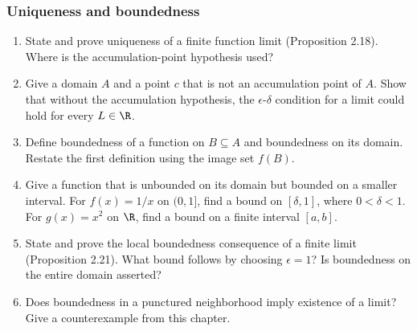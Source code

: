 \subsubsection*{Uniqueness and boundedness}
\begin{enumerate}[resume]
  \item State and prove uniqueness of a finite function limit
    (Proposition 2.18). Where is the accumulation-point hypothesis used?

  \item Give a domain \(A\) and a point \(c\) that is not an
    accumulation point of \(A\). Show that without the accumulation
    hypothesis, the \(\epsilon\)-\(\delta\) condition for a limit
    could hold for every \(L\in\R\).

  \item Define boundedness of a function on \(B\subseteq A\) and
    boundedness on its domain. Restate the first definition using the
    image set \(f(B)\).

  \item Give a function that is unbounded on its domain but bounded on
    a smaller interval. For \(f(x)=1/x\) on \((0,1]\), find a bound
    on \([\delta,1]\), where \(0<\delta<1\).
    For \(g(x)=x^2\) on \(\R\), find a bound on a finite interval \([a,b]\).

  \item State and prove the local boundedness consequence of a finite
    limit (Proposition 2.21). What bound follows by choosing
    \(\epsilon=1\)? Is boundedness on the entire domain asserted?

  \item Does boundedness in a punctured neighborhood imply existence
    of a limit? Give a counterexample from this chapter.
\end{enumerate}

